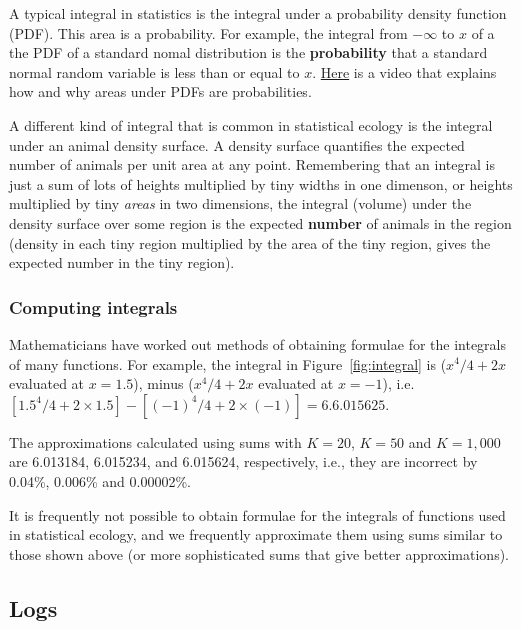 A typical integral in statistics is the integral under a probability density function (PDF). This area is a probability. For example, the integral from $-\infty$ to $x$ of a the PDF of a standard nomal distribution is the \textbf{probability} that a standard normal random variable is less than or equal to $x$. \href{https://www.youtube.com/watch?v=ZA4JkHKZM50}{Here} is a video that explains how and why areas under PDFs are probabilities.

A different kind of integral that is common in statistical ecology is the integral under an animal density surface. A density surface quantifies the expected number of animals per unit area at any point. Remembering that an integral is just a sum of lots of heights multiplied by tiny widths in one dimenson, or heights multiplied by tiny \textit{areas} in two dimensions, the integral (volume) under the density surface over some region is the expected \textbf{number} of animals in the region (density in each tiny region multiplied by the area of the tiny region, gives the expected number in the tiny region). 


\subsubsection{Computing integrals}

Mathematicians have worked out methods of obtaining formulae for the integrals of many functions. For example, the integral in Figure~\ref{fig:integral} is ($x^4/4+2x$ evaluated at $x=1.5$), minus ($x^4/4+2x$ evaluated at $x=-1$), i.e. $[1.5^4/4+2\times 1.5] - [(-1)^4/4+2\times(-1)] = 6.6.015625$.

The approximations calculated using sums with $K=20$, $K=50$ and $K=1,000$ are 6.013184, 6.015234, and 6.015624, respectively, i.e., they are incorrect by 0.04\%, 0.006\% and 0.00002\%.

It is frequently not possible to obtain formulae for the integrals of functions used in statistical ecology, and we frequently approximate them using sums similar to those shown above (or more sophisticated sums that give better approximations). %


\subsection{Logs}

